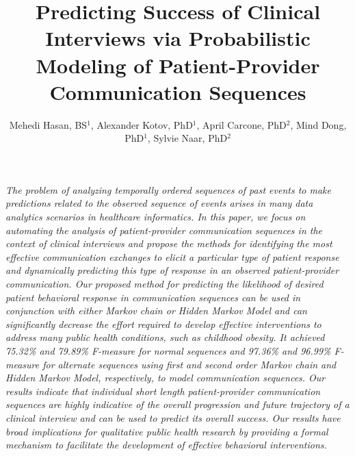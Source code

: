 \documentclass{amia}
\begin{document}
\title{Predicting Success of Clinical Interviews via Probabilistic Modeling of Patient-Provider Communication Sequences}

\author{Mehedi Hasan, BS$^{1}$, Alexander Kotov, PhD$^{1}$, April Carcone, PhD$^{2}$, Mind Dong, PhD$^{1}$, Sylvie Naar, PhD$^{2}$}


\maketitle

\textit{The problem of analyzing temporally ordered sequences of past events to make predictions related to the observed sequence of events arises in many data analytics scenarios in healthcare informatics. In this paper, we focus on automating the analysis of patient-provider communication sequences in the context of clinical interviews and propose the methods for identifying the most effective communication exchanges to elicit a particular type of patient response and dynamically predicting this type of response in an observed patient-provider communication. Our proposed method for predicting the likelihood of desired patient behavioral response in communication sequences can be used in conjunction with either Markov chain or Hidden Markov Model and can significantly decrease the effort  required to develop effective interventions to address many public health conditions, such as childhood obesity. It achieved 75.32\% and 79.89\% F-measure for normal sequences and 97.36\% and 96.99\% F-measure for alternate sequences using first and second order Markov chain and Hidden Markov Model, respectively,  to model communication sequences. Our results indicate that individual short length patient-provider communication sequences are highly indicative of the overall progression and future trajectory of a clinical interview and can be used to predict its overall success. Our results have broad implications for qualitative public health research by providing a formal mechanism to facilitate the development of effective behavioral interventions.}
\end{document}
